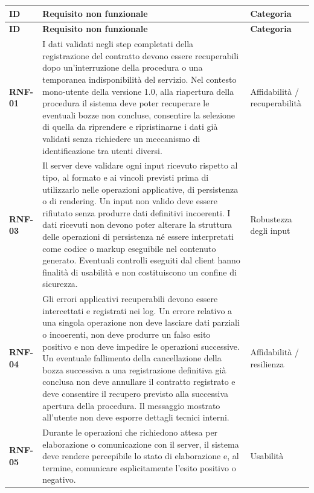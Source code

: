 \documentclass[12pt,a4paper]{article}
\newcommand{\req}[1]{\textbf{#1}}
\begin{document}
\begin{longtable}{>{\raggedright\arraybackslash}p{1.5cm}
                  >{\raggedright\arraybackslash}p{10cm}
                  >{\raggedright\arraybackslash}p{2.2cm}}
\toprule
\textbf{ID} & \textbf{Requisito non funzionale} & \textbf{Categoria} \\
\midrule
\endfirsthead

\toprule
\textbf{ID} & \textbf{Requisito non funzionale} & \textbf{Categoria} \\
\midrule
\endhead

\req{RNF-01} &
I dati validati negli step completati della registrazione del contratto devono essere
recuperabili dopo un'interruzione della procedura o una temporanea indisponibilità del
servizio. Nel contesto mono-utente della versione 1.0, alla riapertura della procedura il
sistema deve poter recuperare le eventuali bozze non concluse, consentire la selezione di
quella da riprendere e ripristinarne i dati già validati senza richiedere un meccanismo di
identificazione tra utenti diversi. &
Affidabilità / recuperabilità \\

\req{RNF-03} &
Il server deve validare ogni input ricevuto rispetto al tipo, al formato e ai vincoli previsti
prima di utilizzarlo nelle operazioni applicative, di persistenza o di rendering. Un input non
valido deve essere rifiutato senza produrre dati definitivi incoerenti. I dati ricevuti non devono
poter alterare la struttura delle operazioni di persistenza né essere interpretati come codice o
markup eseguibile nel contenuto generato. Eventuali controlli eseguiti dal client hanno finalità
di usabilità e non costituiscono un confine di sicurezza. &
Robustezza degli input \\

\req{RNF-04} &
Gli errori applicativi recuperabili devono essere intercettati e registrati nei log.
Un errore relativo a una singola operazione non deve lasciare dati parziali o incoerenti,
non deve produrre un falso esito positivo e non deve impedire le operazioni successive.
Un eventuale fallimento della cancellazione della bozza successiva a una registrazione definitiva
già conclusa non deve annullare il contratto registrato e deve consentire il recupero previsto
alla successiva apertura della procedura.
Il messaggio mostrato all'utente non deve esporre dettagli tecnici interni. &
Affidabilità / resilienza \\

\req{RNF-05} &
Durante le operazioni che richiedono attesa per elaborazione o comunicazione con il server,
il sistema deve rendere percepibile lo stato di elaborazione e, al termine, comunicare
esplicitamente l'esito positivo o negativo. &
Usabilità \\

\bottomrule
\end{longtable}
\end{document}
